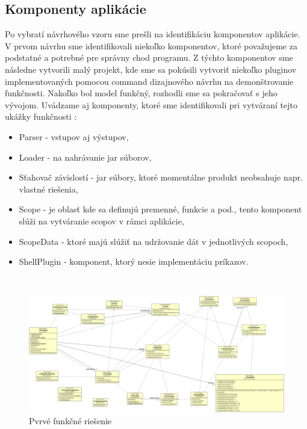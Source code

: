 \subsection{Komponenty aplikácie}
\indent Po vybratí návrhového vzoru sme prešli na identifikáciu komponentov aplikácie. V prvom návrhu sme identifikovali niekoľko komponentov, ktoré považujeme za podstatné a potrebné pre správny chod programu. Z týchto komponentov sme následne vytvorili malý projekt, kde sme sa pokúsili vytvoriť niekoľko pluginov implementovaných pomocou command dizajnového návrhu na demonštrovanie funkčnosti. Nakoľko bol model funkčný, rozhodli sme sa pokračovať s jeho vývojom. Uvádzame aj komponenty, ktoré sme identifikovali pri vytváraní tejto ukážky funkčnosti : 
\begin{itemize}
	\item Parser - vstupov aj výstupov,
	\item Loader - na nahrávanie  \acrshort{jar} súborov,
	\item Sťahovač závislostí - \acrshort{jar} súbory, ktoré momentálne produkt neobsahuje napr. vlastné riešenia,
	\item Scope - je oblasť kde sa definujú premenné, funkcie a pod., tento komponent slúži na vytváranie scopov v rámci aplikácie,
	\item ScopeData - ktoré majú slúžiť na udržovanie dát v jednotlivých scopoch,
	\item ShellPlugin - komponent, ktorý nesie implementáciu príkazov.
\end{itemize}

 \begin{figure}[!htbp]
	\centering
	\includegraphics[width=\linewidth]{img/first_attemp_class_diag.jpg}
	\caption{Pvrvé funkčné riešenie}
	\label{fig:test}
\end{figure}
\newline
